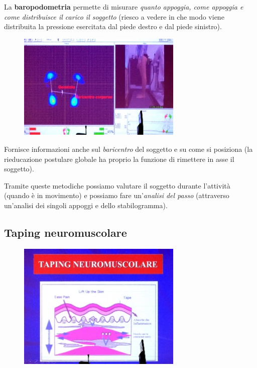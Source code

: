 La \textbf{baropodometria} permette di misurare \emph{quanto appoggia,
come appoggia e come distribuisce il carico il soggetto} (riesco a
vedere in che modo viene distribuita la pressione esercitata dal piede
destro e dal piede sinistro).

\begin{figure}[!ht]
\centering
	\includegraphics[width=0.7\textwidth]{030/image15.jpeg}
\end{figure}

Fornisce
informazioni anche sul \emph{baricentro} del soggetto e su come si
posiziona (la rieducazione postulare globale ha proprio la funzione di
rimettere in asse il soggetto).

Tramite queste metodiche possiamo valutare il soggetto durante
l'attività (quando è in movimento) e possiamo fare un'\emph{analisi del
passo} (attraverso un'analisi dei singoli appoggi e dello
stabilogramma).

\subsection{Taping neuromuscolare}


\begin{figure}[!ht]
\centering
	\includegraphics[width=0.7\textwidth]{030/image16.jpeg}
\end{figure}

